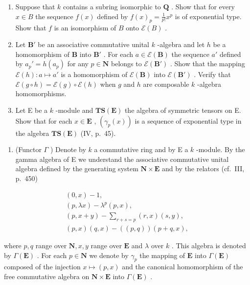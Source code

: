\begin{enumerate}
\def\labelenumi{\alph{enumi})}
\setcounter{enumi}{1}
\item
  Suppose that \(k\) contains a subring isomorphic to \(\mathbf{Q}\) . Show that for every \(x \in B\) the sequence \(f(x)\) defined by \(f(x)_p = \frac{1}{p!} x^p\) is of exponential type. Show that \(f\) is an isomorphism of \(B\) onto \(\mathcal{E}(B)\) .
\item
  Let \(\mathbf{B}'\) be an associative commutative unital \(k\) -algebra and let \(h\) be a homomorphism of \(\mathbf{B}\) into \(\mathbf{B}'\) . For each \(a \in \mathcal{E}(\mathbf{B})\) the sequence \(a'\) defined by \(a_p' = h(a_p)\) for any \(p \in \mathbf{N}\) belongs to \(\mathcal{E}(\mathbf{B}')\) . Show that the mapping \(\mathcal{E}(h): a \mapsto a'\) is a homomorphism of \(\mathcal{E}(\mathbf{B})\) into \(\mathcal{E}(\mathbf{B}')\) . Verify that \(\mathcal{E}(g \circ h) = \mathcal{E}(g) \circ \mathcal{E}(h)\) when \(g\) and \(h\) are composable \(k\) -algebra homomorphisms.
\item
  Let E be a \(k\) -module and \(\mathbf{TS}(\mathbf{E})\) the algebra of symmetric tensors on E. Show that for each \(x \in \mathbf{E}\) , \((\gamma_p(x))\) is a sequence of exponential type in the algebra \(\mathbf{TS}(\mathbf{E})\) (IV, p.~45).
\end{enumerate}

\begin{enumerate}
\def\labelenumi{\arabic{enumi})}
\setcounter{enumi}{1}
\tightlist
\item
  (Functor \(\Gamma\) ) Denote by \(k\) a commutative ring and by E a \(k\) -module. By the gamma algebra of E we understand the associative commutative unital algebra defined by the generating system \(\mathbf{N} \times \mathbf{E}\) and by the relators (cf.~III, p.~450)
\end{enumerate}

\[
\begin{array}{c} (0, x) - 1, \\ (p, \lambda x) - \lambda^ {p} (p, x), \\ (p, x + y) - \sum_ {r + s = p} (r, x) (s, y), \\ (p, x) (q, x) - ((p, q)) (p + q, x), \end{array}
\]

where \(p, q\) range over \(\mathbf{N}, x, y\) range over \(\mathbf{E}\) and \(\lambda\) over \(k\) . This algebra is denoted by \(\Gamma(\mathbf{E})\) . For each \(p \in \mathbf{N}\) we denote by \(\gamma_p\) the mapping of \(\mathbf{E}\) into \(\Gamma(\mathbf{E})\) composed of the injection \(x \mapsto (p, x)\) and the canonical homomorphism of the free commutative algebra on \(\mathbf{N} \times \mathbf{E}\) into \(\Gamma(\mathbf{E})\) .

